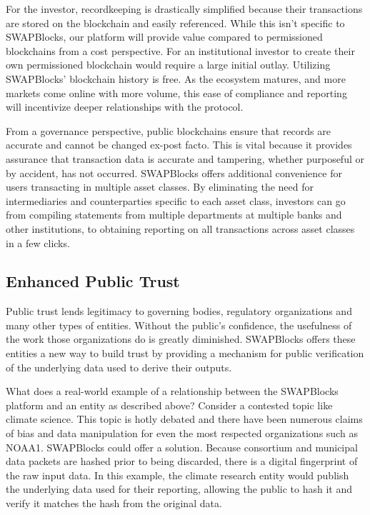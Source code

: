 \documentclass[12pt]{article}
\begin{document}
For the investor, recordkeeping is drastically simplified because their transactions are stored on the blockchain and easily referenced. 
While this isn’t specific to SWAPBlocks, our platform will provide value compared to permissioned blockchains from a cost perspective. 
For an institutional investor to create their own permissioned blockchain would require a large initial outlay. Utilizing SWAPBlocks’ 
blockchain history is free. As the ecosystem matures, and more markets come online with more volume, this ease of compliance and 
reporting will incentivize deeper relationships with the protocol.

From a governance perspective, public blockchains ensure that records are accurate and cannot be changed ex-post facto. This is vital 
because it provides assurance that transaction data is accurate and tampering, whether purposeful or by accident, has not occurred. 
SWAPBlocks offers additional convenience for users transacting in multiple asset classes. By eliminating the need for intermediaries and 
counterparties specific to each asset class, investors can go from compiling statements from multiple departments at multiple banks and 
other institutions, to obtaining reporting on all transactions across asset classes in a few clicks.

\subsection{Enhanced Public Trust}
Public trust lends legitimacy to governing bodies, regulatory organizations and many other types of entities. 
Without the public’s confidence, the usefulness of the work those organizations do is greatly diminished. SWAPBlocks 
offers these entities a new way to build trust by providing a mechanism for public verification of the underlying data used to derive their outputs.

What does a real-world example of a relationship between the SWAPBlocks platform and an entity as described above? 
Consider a contested topic like climate science. This topic is hotly debated and there have been numerous claims of bias 
and data manipulation for even the most respected organizations such as NOAA1. SWAPBlocks could offer a solution. Because consortium 
and municipal data packets are hashed prior to being discarded, there is a digital fingerprint of the raw input data. In this example, 
the climate research entity would publish the underlying data used for their reporting, allowing the public to hash it and verify it 
matches the hash from the original data.
\end{document}
